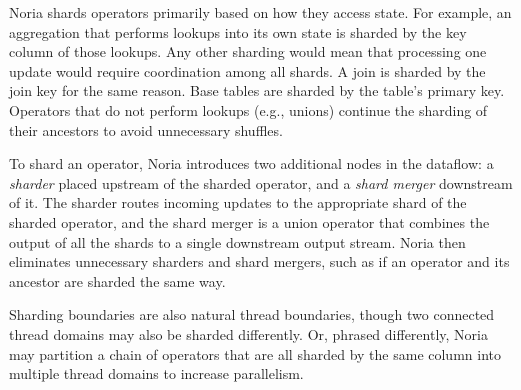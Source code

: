Noria shards operators primarily based on how they access state. For example, an
aggregation that performs lookups into its own state is sharded by the key
column of those lookups. Any other sharding would mean that processing one
update would require coordination among all shards. A join is sharded by the
join key for the same reason. Base tables are sharded by the table's primary
key. Operators that do not perform lookups (e.g., unions) continue the sharding
of their ancestors to avoid unnecessary shuffles.

To shard an operator, Noria introduces two additional nodes in the dataflow: a
\emph{sharder} placed upstream of the sharded operator, and a \emph{shard
merger} downstream of it. The sharder routes incoming updates to the appropriate
shard of the sharded operator, and the shard merger is a union operator that
combines the output of all the shards to a single downstream output stream.
Noria then eliminates unnecessary sharders and shard mergers, such as if an
operator and its ancestor are sharded the same way.

Sharding boundaries are also natural thread boundaries, though two connected
thread domains may also be sharded differently. Or, phrased differently, Noria
may partition a chain of operators that are all sharded by the same column into
multiple thread domains to increase parallelism.

